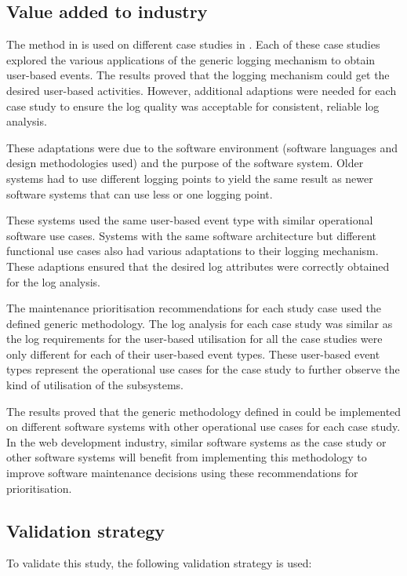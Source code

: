 \subsection{Value added to industry}
The method in  is used on different case studies in . Each of these case studies explored the various applications of the generic logging mechanism to obtain user-based events. The results proved that the logging mechanism could get the desired user-based activities. However, additional adaptions were needed for each case study to ensure the log quality was acceptable for consistent, reliable log analysis.\par These adaptations were due to the software environment (software languages and design methodologies used) and the purpose of the software system. Older systems had to use different logging points to yield the same result as newer software systems that can use less or one logging point.\par These systems used the same user-based event type with similar operational software use cases. Systems with the same software architecture but different functional use cases also had various adaptations to their logging mechanism. These adaptions ensured that the desired log attributes were correctly obtained for the log analysis. \par The maintenance prioritisation recommendations for each study case used the defined generic methodology. The log analysis for each case study was similar as the log requirements for the user-based utilisation for all the case studies were only different for each of their user-based event types. These user-based event types represent the operational use cases for the case study to further observe the kind of utilisation of the subsystems. \par The results proved that the generic methodology defined in  could be implemented on different software systems with other operational use cases for each case study. In the web development industry, similar software systems as the case study or other software systems will benefit from implementing this methodology to improve software maintenance decisions using these recommendations for prioritisation.

\subsection{Validation strategy}
To validate this study, the following validation strategy is used:

